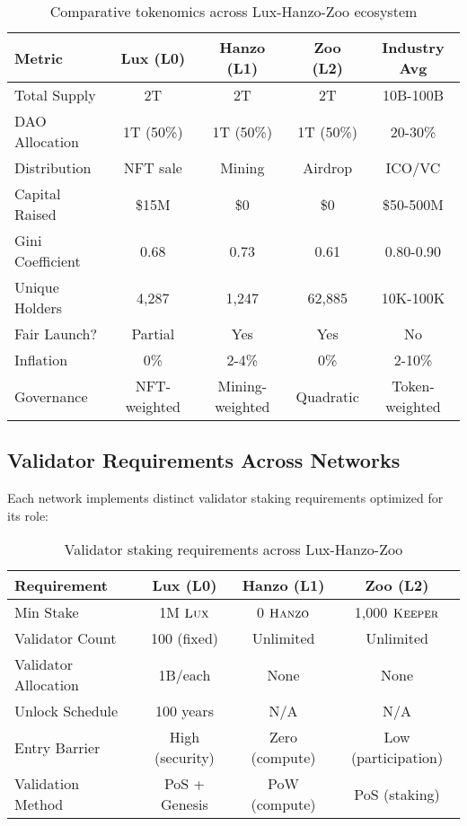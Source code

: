\documentclass[11pt,letterpaper]{article}
\theoremstyle{definition}
\theoremstyle{remark}
\newcommand{\KEEPER}{\textsc{Keeper}}
\newcommand{\Hanzo}{\textsc{Hanzo}}
\newcommand{\Lux}{\textsc{Lux}}
\begin{document}
\begin{table}[h]
\centering
\small
\begin{tabular}{lcccc}
\toprule
\textbf{Metric} & \textbf{Lux (L0)} & \textbf{Hanzo (L1)} & \textbf{Zoo (L2)} & \textbf{Industry Avg} \\
\midrule
Total Supply & 2T & 2T & 2T & 10B-100B \\
DAO Allocation & 1T (50\%) & 1T (50\%) & 1T (50\%) & 20-30\% \\
Distribution & NFT sale & Mining & Airdrop & ICO/VC \\
Capital Raised & \$15M & \$0 & \$0 & \$50-500M \\
Gini Coefficient & 0.68 & 0.73 & 0.61 & 0.80-0.90 \\
Unique Holders & 4,287 & 1,247 & 62,885 & 10K-100K \\
Fair Launch? & Partial & Yes & Yes & No \\
Inflation & 0\% & 2-4\% & 0\% & 2-10\% \\
Governance & NFT-weighted & Mining-weighted & Quadratic & Token-weighted \\
\bottomrule
\end{tabular}
\caption{Comparative tokenomics across Lux-Hanzo-Zoo ecosystem}
\label{tab:cross_network}
\end{table}

\subsection{Validator Requirements Across Networks}

Each network implements distinct validator staking requirements optimized for its role:

\begin{table}[h]
\centering
\begin{tabular}{lccc}
\toprule
\textbf{Requirement} & \textbf{Lux (L0)} & \textbf{Hanzo (L1)} & \textbf{Zoo (L2)} \\
\midrule
Min Stake & 1M $\Lux$ & 0 $\Hanzo$ & 1,000 $\KEEPER$ \\
Validator Count & 100 (fixed) & Unlimited & Unlimited \\
Validator Allocation & 1B/each & None & None \\
Unlock Schedule & 100 years & N/A & N/A \\
Entry Barrier & High (security) & Zero (compute) & Low (participation) \\
Validation Method & PoS + Genesis & PoW (compute) & PoS (staking) \\
\bottomrule
\end{tabular}
\caption{Validator staking requirements across Lux-Hanzo-Zoo}
\label{tab:validator_comparison}
\end{table}
\end{document}
